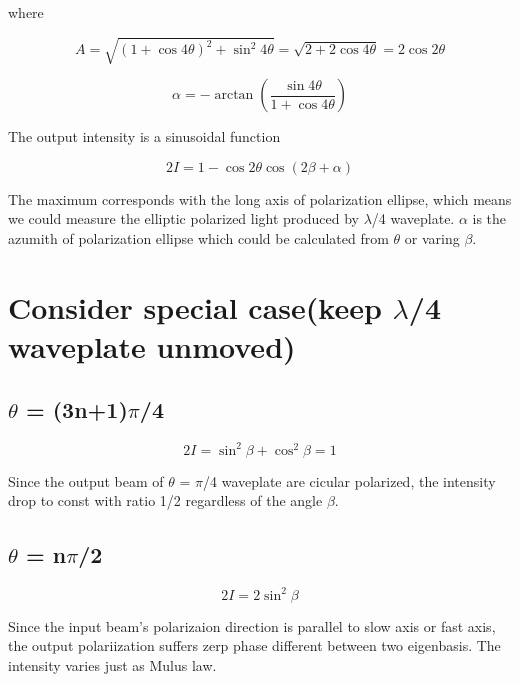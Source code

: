 \documentclass[12pt]{article}
\begin{document}
where

$$
A=\sqrt{(1+\cos 4\theta)^2+\sin^2 4\theta}=\sqrt{2+ 2\cos 4\theta}=2\cos 2\theta
$$

$$
\alpha =-\arctan \left(\frac{\sin 4\theta}{1+\cos 4\theta}\right)
$$

The output intensity is a sinusoidal function

$$
2I=1-\cos 2\theta\cos (2\beta +\alpha)
$$

The maximum corresponds with the long axis of polarization ellipse,
which means we could measure the elliptic polarized light produced by $ \lambda $/4 waveplate.
$ \alpha $ is the azumith of  polarization ellipse which could be calculated from $ \theta $ or varing $ \beta $.

 
\section*{Consider special case(keep $ \lambda $/4 waveplate unmoved)}



\subsection*{$ \theta $ = (3n+1)$ \pi $/4}

$$
2I=\sin^2\beta +\cos^2\beta =1
$$

Since the output beam of $ \theta $ = $ \pi $/4 waveplate  are cicular polarized,
the intensity drop to const with ratio 1/2 regardless of the angle $ \beta $.

\subsection*{$ \theta $ = n$ \pi $/2}

$$
2I=2\sin^2 \beta
$$

Since the input beam's polarizaion direction is parallel to slow axis or fast axis,
the output polariization suffers zerp phase different between two  eigenbasis.
The intensity varies just as Mulus law.
\end{document}
